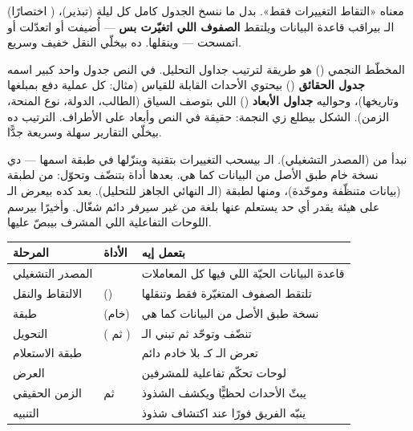 \begin{idea}
 (اختصارًا ) معناه «التقاط التغييرات فقط». بدل ما
ننسخ الجدول كامل كل ليلة (تبذير)، الـ بيراقب قاعدة البيانات ويلتقط
\textbf{الصفوف اللي اتغيّرت بس} — أُضيفت أو اتعدّلت أو اتمسحت — وينقلها. ده بيخلّي
النقل خفيف وسريع.
\end{idea}

\begin{idea}
المخطّط النجمي () هو طريقة لترتيب جداول التحليل. في النص جدول
واحد كبير اسمه \textbf{جدول الحقائق} () بيحتوي الأحداث القابلة
للقياس (مثال: كل عملية دفع بمبلغها وتاريخها)، وحواليه \textbf{جداول الأبعاد}
() اللي بتوصف السياق (الطالب، الدولة، نوع المنحة، الزمن).
الشكل بيطلع زي النجمة: حقيقة في النص وأبعاد على الأطراف. الترتيب ده بيخلّي التقارير
سهلة وسريعة جدًّا.
\end{idea}

نبدأ من  (المصدر التشغيلي). الـ بيسحب
التغييرات بتقنية  وينزّلها في طبقة اسمها \textbf{} — دي نسخة
خام طبق الأصل من البيانات كما هي. بعدها أداة  بتنضّف وتحوّل: من
 لطبقة \textbf{} (بيانات متنظّفة وموحّدة)، ومنها لطبقة
\textbf{} (الـ النهائي الجاهز للتحليل). بعد كده
 بيعرض الـ على هيئة  يقدر أي حد
يستعلم عنها بلغة  من غير سيرفر دائم شغّال. وأخيرًا  بيرسم
اللوحات التفاعلية اللي المشرف بيبصّ عليها.

\begin{center}
\begin{tabular}{L{3.1cm} L{4.0cm} L{5.2cm}}
\toprule
\textbf{\color{spPrimary}المرحلة} & \textbf{\color{spPrimary}الأداة} & \textbf{\color{spPrimary}بتعمل إيه} \\
\midrule
المصدر التشغيلي &  & قاعدة البيانات الحيّة اللي فيها كل المعاملات \\
الالتقاط والنقل &  () & تلتقط الصفوف المتغيّرة فقط وتنقلها \\
طبقة  &  (خام) & نسخة طبق الأصل من البيانات كما هي \\
التحويل &  ( ثم ) & تنضّف وتوحّد ثم تبني الـ \\
طبقة الاستعلام &  & تعرض الـ كـ بلا خادم دائم \\
العرض &  & لوحات تحكّم تفاعلية للمشرفين \\
الزمن الحقيقي &  ثم  & يبثّ الأحداث لحظيًّا ويكشف الشذوذ \\
التنبيه &  & ينبّه الفريق فورًا عند اكتشاف شذوذ \\
\bottomrule
\end{tabular}
\end{center}

